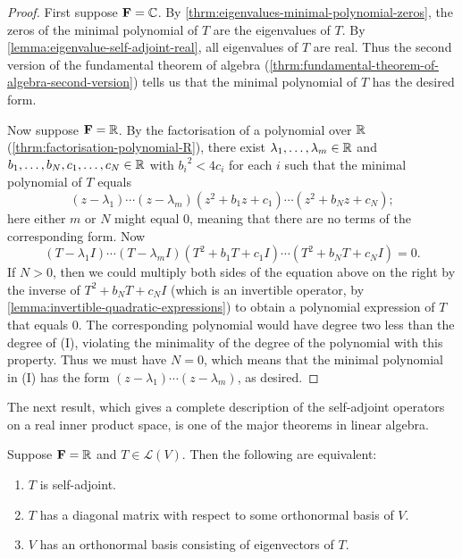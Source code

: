 \begin{proof}
First suppose $\mathbf F=\mathbb C$. By \ref{thrm:eigenvalues-minimal-polynomial-zeros}, the zeros of the minimal polynomial of $T$ are the eigenvalues of $T$. 
By \ref{lemma:eigenvalue-self-adjoint-real}, all eigenvalues of $T$ are real. 
Thus the second version of the fundamental theorem of algebra (\ref{thrm:fundamental-theorem-of-algebra-second-version}) tells us that the minimal polynomial of $T$ has the desired form.

Now suppose $\mathbf F=\mathbb R$. By the factorisation of a polynomial over $\mathbb R$ (\ref{thrm:factorisation-polynomial-R}), there exist $\lambda_1,\dots,\lambda_m\in\mathbb R$ and $b_1,\dots,b_N,c_1,\dots,c_N\in\mathbb R$ with ${b_i}^2<4c_i$ for each $i$ such that the minimal polynomial of $T$ equals
\begin{equation*}\tag{I}
(z-\lambda_1)\cdots(z-\lambda_m)(z^2+b_1z+c_1)\cdots(z^2+b_Nz+c_N);
\end{equation*}
here either $m$ or $N$ might equal $0$, meaning that there are no terms of the corresponding form. Now
\[(T-\lambda_1 I)\cdots(T-\lambda_m I)(T^2+b_1 T+c_1 I)\cdots(T^2+b_N T+c_N I)=0.\]
If $N>0$, then we could multiply both sides of the equation above on the right by the inverse of $T^2+b_N T+c_N I$ (which is an invertible operator, by \ref{lemma:invertible-quadratic-expressions}) to obtain a polynomial expression of $T$ that equals $0$. 
The corresponding polynomial would have degree two less than the degree of (I), violating the minimality of the degree of the polynomial with this property. 
Thus we must have $N=0$, which means that the minimal polynomial in (I) has the form $(z-\lambda_1)\cdots(z-\lambda_m)$, as desired.
\end{proof}

The next result, which gives a complete description of the self-adjoint operators on a real inner product space, is one of the major theorems in linear algebra.

\begin{theorem}\label{thrm:real-spectral-theorem}
Suppose $\mathbf F=\mathbb R$ and $T\in\mathcal{L}(V)$. Then the following are equivalent:
\begin{enumerate}[label=(\roman*)]
\item $T$ is self-adjoint.
\item $T$ has a diagonal matrix with respect to some orthonormal basis of $V$.
\item $V$ has an orthonormal basis consisting of eigenvectors of $T$.
\end{enumerate}
\end{theorem}

